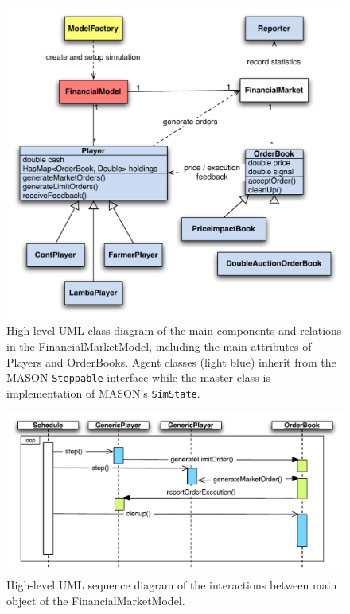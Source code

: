 \documentclass[runningheads]{llncs}
\begin{document}
\begin{figure}[htb]
\centering
\includegraphics[width=1.0\textwidth]{../graphics/masterClassDiagram.pdf}
\caption{High-level UML class diagram of the main components and relations in the FinancialMarketModel, including the main attributes of Players and OrderBooks. Agent classes (light blue) inherit from the MASON \texttt{Steppable} interface while the master class is implementation of MASON's \texttt{SimState}.}
\label{fig:general_uml}
\end{figure}


\begin{figure}[htb]
\centering
\includegraphics[width=1.0\textwidth]{../graphics/masterSequenceDiagram.pdf}
\caption{High-level UML sequence diagram of the interactions between main object of the FinancialMarketModel.}
\label{fig:general_uml}
\end{figure}
\end{document}

